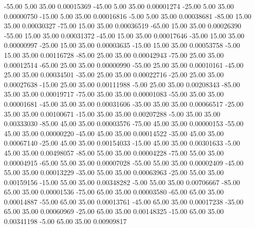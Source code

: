     -55.00      5.00     35.00     0.00015369
    -45.00      5.00     35.00     0.00001274
    -25.00      5.00     35.00     0.00000750
    -15.00      5.00     35.00     0.00016816
     -5.00      5.00     35.00     0.00038681
    -85.00     15.00     35.00     0.00030327
    -75.00     15.00     35.00     0.00036519
    -65.00     15.00     35.00     0.00026390
    -55.00     15.00     35.00     0.00031372
    -45.00     15.00     35.00     0.00017646
    -35.00     15.00     35.00     0.00000997
    -25.00     15.00     35.00     0.00003635
    -15.00     15.00     35.00     0.00053758
     -5.00     15.00     35.00     0.00116728
    -85.00     25.00     35.00     0.00042943
    -75.00     25.00     35.00     0.00012514
    -65.00     25.00     35.00     0.00000990
    -55.00     25.00     35.00     0.00010161
    -45.00     25.00     35.00     0.00034501
    -35.00     25.00     35.00     0.00022716
    -25.00     25.00     35.00     0.00027638
    -15.00     25.00     35.00     0.00111988
     -5.00     25.00     35.00     0.00208343
    -85.00     35.00     35.00     0.00019717
    -75.00     35.00     35.00     0.00001083
    -55.00     35.00     35.00     0.00001681
    -45.00     35.00     35.00     0.00031606
    -35.00     35.00     35.00     0.00066517
    -25.00     35.00     35.00     0.00100671
    -15.00     35.00     35.00     0.00207288
     -5.00     35.00     35.00     0.00333030
    -85.00     45.00     35.00     0.00003576
    -75.00     45.00     35.00     0.00000153
    -55.00     45.00     35.00     0.00000220
    -45.00     45.00     35.00     0.00014522
    -35.00     45.00     35.00     0.00067140
    -25.00     45.00     35.00     0.00154033
    -15.00     45.00     35.00     0.00301633
     -5.00     45.00     35.00     0.00498057
    -85.00     55.00     35.00     0.00004228
    -75.00     55.00     35.00     0.00004915
    -65.00     55.00     35.00     0.00007028
    -55.00     55.00     35.00     0.00002409
    -45.00     55.00     35.00     0.00013229
    -35.00     55.00     35.00     0.00063963
    -25.00     55.00     35.00     0.00159156
    -15.00     55.00     35.00     0.00348282
     -5.00     55.00     35.00     0.00706667
    -85.00     65.00     35.00     0.00001536
    -75.00     65.00     35.00     0.00003580
    -65.00     65.00     35.00     0.00014887
    -55.00     65.00     35.00     0.00013761
    -45.00     65.00     35.00     0.00017238
    -35.00     65.00     35.00     0.00060969
    -25.00     65.00     35.00     0.00148325
    -15.00     65.00     35.00     0.00341198
     -5.00     65.00     35.00     0.00909817

